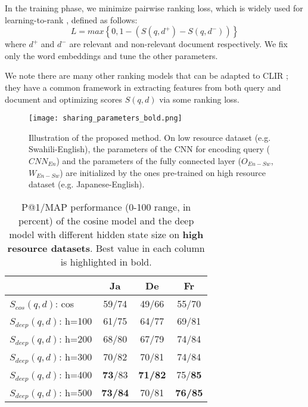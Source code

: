 \documentclass[11pt,a4paper]{article}
\begin{document}
In the training phase, we minimize pairwise ranking loss, which is widely used for learning-to-rank \cite{pang16pyramid, guo16DRMM, hui17pacrr, xiong17kernel, dehghani17weak}, defined as follows:
\begin{equation}
L = max \left\{ 0, 1-(S(q,d^+)-S(q,d^-)) \right\}
\end{equation}
%
where $d^+$ and $d^-$ are relevant and non-relevant document respectively.
We fix only the word embeddings and tune the other parameters.

We note there are many other ranking models that can be adapted to CLIR \cite{huang13clickthrough, shen14latent, xiong17kernel, mitra17web}; they have a common framework in extracting features from both query and document and optimizing scores $S(q,d)$ via some ranking loss. 

%
\begin{figure}[t]
	\centering
	\texttt{[image: sharing\_parameters\_bold.png]}
	\caption{Illustration of the proposed method. On low resource dataset (e.g. Swahili-English), the parameters of the CNN for encoding query ($CNN_{En}$) and the parameters of the fully connected layer ($O_{En-Sw}$, $W_{En-Sw}$) are initialized by the ones pre-trained on high resource dataset (e.g. Japanese-English).}
	\label{sharing_parameters}
\end{figure}

%
\begin{table}[t]
	\begin{center}
		\begin{tabular}{ |l || c | c | c |} \hline
			& Ja & De & Fr  \\ \hline\hline
			$S_{cos}(q,d)$: cos & 59/74 & 49/66 & 55/70 \\ \hline
			$S_{deep}(q,d)$: h=100 & 61/75 & 64/77 & 69/81 \\ \hline
			$S_{deep}(q,d)$: h=200 & 68/80 & 67/79 & 74/84 \\ \hline
			$S_{deep}(q,d)$: h=300 & 70/82 & 70/81 & 74/84 \\ \hline
			$S_{deep}(q,d)$: h=400 & {\bf73}/83 & \bf71/82 & 75/{\bf85} \\ \hline
			$S_{deep}(q,d)$: h=500 & \bf73/84 & 70/81 & \bf76/85 \\ \hline
		\end{tabular}
		\caption{\label {tab:result_for_high_resource}
P@1/MAP performance (0-100 range, in percent) of the cosine model and the deep model with different hidden state size on \textbf{high resource datasets}. Best value in each column is highlighted in bold.}
	\end{center}
\end{table}
%
\end{document}
